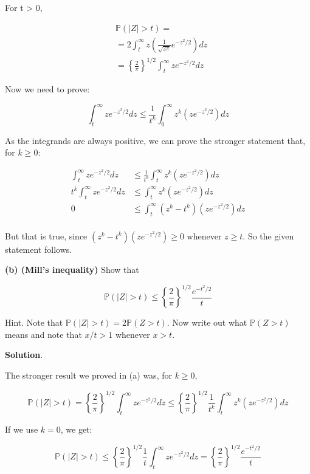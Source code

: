 For t > 0,

\begin{align*}
&\mathbb{P}(|Z| > t) = \\
&= 2 \int _t^{\infty} z\left( \frac{1}{\sqrt{2\pi}} e^{-z^{2}/2} \right) dz \\
&= \left\{ \frac{2}{\pi} \right\}^{1/2} \int _t^{\infty} z e^{-z^{2}/2} dz
\end{align*}

Now we need to prove:

\[\int _t^{\infty} z e^{-z^{2}/2} dz \leq \frac{1}{t^{k}}\int _{0}^{\infty} z^{k} \left( z e^{-z^{2}/2} \right) dz \]

As the integrands are always positive, we can prove the stronger
statement that, for \(k \geq 0\):

\begin{align*}
\int _t^{\infty} z e^{-z^{2}/2} dz & \leq \frac{1}{t^{k}}\int _{t}^{\infty} z^{k} \left( z e^{-z^{2}/2} \right) dz  \\
t^{k} \int _t^{\infty} z e^{-z^{2}/2} dz & \leq \int _{t}^{\infty} z^{k} \left( z e^{-z^{2}/2} \right) dz  \\
0 & \leq \int _{t}^{\infty} (z^{k} - t^{k}) \left( z e^{-z^{2}/2} \right) dz  \\
\end{align*}

But that is true, since \((z^{k} - t^{k}) (z e^{-z^{2}/2}) \geq 0\) whenever
\(z \geq t\). So the given statement follows.

\textbf{(b) (Mill's inequality)} Show that

\[\mathbb{P}(|Z| > t) \leq \left\{ \frac{2}{\pi} \right\}^{1/2} \frac{e^{-t^{2}/2}}{t}\]

Hint. Note that \(\mathbb{P}(|Z| > t) = 2\mathbb{P}(Z > t)\). Now write
out what \(\mathbb{P}(Z > t)\) means and note that \(x/t > 1\) whenever
\(x > t\).

\textbf{Solution}.

The stronger result we proved in (a) was, for \(k \geq 0\),

\[
\mathbb{P}(|Z| > t) = \left\{ \frac{2}{\pi} \right\}^{1/2}  \int _t^{\infty} z e^{-z^{2}/2} dz \leq \left\{ \frac{2}{\pi} \right\}^{1/2} \frac{1}{t^{k}}\int _{t}^{\infty} z^{k} \left( z e^{-z^{2}/2} \right) dz
\]

If we use \(k = 0\), we get:

\[
\mathbb{P}(|Z| > t) \leq \left\{ \frac{2}{\pi} \right\}^{1/2} \frac{1}{t}\int _{t}^{\infty} z e^{-z^{2}/2} dz = \left\{ \frac{2}{\pi} \right\}^{1/2} \frac{e^{-t^{2}/2}}{t}
\]

